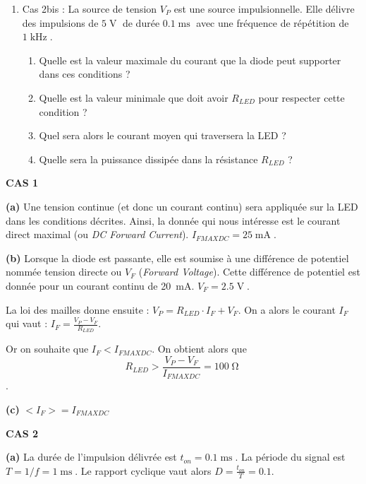 \documentclass[a4paper,french]{paper}
\begin{document}
{\begin{enumerate}
	\bigskip
	
	On s'intéresse maintenant à une LED infrarouge (IR) de type SFH415 (documentation fournie en annexe). 

	\item Cas 2bis : La source de tension $V_P$ est une source impulsionnelle. Elle délivre des impulsions de $5\operatorname{V}$ de durée $0.1\operatorname{ms}$ avec une fréquence de répétition de $1\operatorname{kHz}$.
	\begin{enumerate}
		\item Quelle est la valeur maximale du courant que la diode peut supporter dans ces conditions ?
		\item Quelle est la valeur minimale que doit avoir $R_{LED}$ pour respecter cette condition ?
		\item Quel sera alors le courant moyen qui traversera la LED ?
		\item Quelle sera la puissance dissipée dans la résistance $R_{LED}$ ?
	\end{enumerate}
\end{enumerate}
}

\textbf{\large CAS 1}

\textbf{(a)} Une tension continue (et donc un courant continu) sera appliquée sur la LED dans les conditions décrites. Ainsi, la donnée qui nous intéresse est le courant direct maximal (ou \textit{DC Forward Current}). $I_{FMAXDC} = 25\operatorname{mA}$.


\textbf{(b)} Lorsque la diode est passante, elle est soumise à une différence de potentiel nommée tension directe ou $V_F$ (\textit{Forward Voltage}). Cette différence de potentiel est donnée pour un courant continu de 20~mA. $V_F = 2.5\operatorname{V}$.

La loi des mailles donne ensuite : $V_P = R_{LED} \cdot I_F + V_F$. On a alors le courant $I_F$ qui vaut : $I_F = \frac{V_P - V_F}{R_{LED}}$.

Or on souhaite que $I_F < I_{FMAXDC}$. On obtient alors que $$R_{LED} > \frac{V_P - V_F}{I_{FMAXDC}} = 100\operatorname{\Omega}$$.

\textbf{(c)} $<I_F> = I_{FMAXDC}$

\qquad

\textbf{\large CAS 2}

\textbf{(a)} La durée de l'impulsion délivrée est $t_{on} = 0.1\operatorname{ms}$. La période du signal est $T = 1/f = 1\operatorname{ms}$. Le rapport cyclique vaut alors $D = \frac{t_{on}}{T} = 0.1$.
\end{document}
